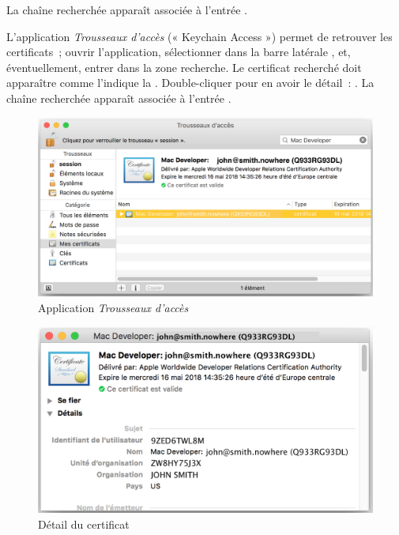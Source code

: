 La chaîne recherchée apparaît associée à l'entrée .




L'application \emph{Trousseaux d'accès} (« Keychain Access ») permet de retrouver les certificats~; ouvrir l'application, sélectionner dans la barre latérale , et, éventuellement, entrer  dans la zone recherche. Le certificat recherché doit apparaître comme l'indique la . Double-cliquer pour en avoir le détail~: . La chaîne recherchée apparaît associée à l'entrée .


\begin{figure}[!t]
  \centering
  \includegraphics[width=14cm]{chapitre-cocoa-features/trousseaux-acces.png}
  \caption{Application \emph{Trousseaux d'accès}}
\end{figure}




\begin{figure}[!t]
  \centering
  \includegraphics[width=14cm]{chapitre-cocoa-features/certificat.png}
  \caption{Détail du certificat}
\end{figure}






